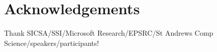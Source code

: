 \section*{Acknowledgements}
\label{s:ack}

Thank SICSA/SSI/Microsoft Research/EPSRC/St Andrews Comp Science/speakers/participants!
